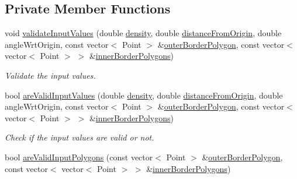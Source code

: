 \subsection*{Private Member Functions}
\begin{DoxyCompactItemize}
\item 
void \hyperlink{classmultiscale_1_1analysis_1_1Region_a6907c9f0300a4b48589164e9fea8d18e}{validate\-Input\-Values} (double \hyperlink{classmultiscale_1_1analysis_1_1SpatialEntityPseudo3D_aedf807816f8c2f7cd961acfe0042fc56}{density}, double \hyperlink{classmultiscale_1_1analysis_1_1SpatialEntityPseudo3D_a056f67b90ed41c0e6dc4df31b71ad906}{distance\-From\-Origin}, double angle\-Wrt\-Origin, const vector$<$ Point $>$ \&\hyperlink{classmultiscale_1_1analysis_1_1Region_a5cf5012f0f248cc7135f04c049365fb8}{outer\-Border\-Polygon}, const vector$<$ vector$<$ Point $>$ $>$ \&\hyperlink{classmultiscale_1_1analysis_1_1Region_adf9ce65ec31dae1083adbfed3a8f69e1}{inner\-Border\-Polygons})
\begin{DoxyCompactList}\small\item\em Validate the input values. \end{DoxyCompactList}\item 
bool \hyperlink{classmultiscale_1_1analysis_1_1Region_a69d381b185c0fc84675538bec28da0e8}{are\-Valid\-Input\-Values} (double \hyperlink{classmultiscale_1_1analysis_1_1SpatialEntityPseudo3D_aedf807816f8c2f7cd961acfe0042fc56}{density}, double \hyperlink{classmultiscale_1_1analysis_1_1SpatialEntityPseudo3D_a056f67b90ed41c0e6dc4df31b71ad906}{distance\-From\-Origin}, double angle\-Wrt\-Origin, const vector$<$ Point $>$ \&\hyperlink{classmultiscale_1_1analysis_1_1Region_a5cf5012f0f248cc7135f04c049365fb8}{outer\-Border\-Polygon}, const vector$<$ vector$<$ Point $>$ $>$ \&\hyperlink{classmultiscale_1_1analysis_1_1Region_adf9ce65ec31dae1083adbfed3a8f69e1}{inner\-Border\-Polygons})
\begin{DoxyCompactList}\small\item\em Check if the input values are valid or not. \end{DoxyCompactList}\item 
bool \hyperlink{classmultiscale_1_1analysis_1_1Region_aa7156f1a0d541ef24da8f71526540b12}{are\-Valid\-Input\-Polygons} (const vector$<$ Point $>$ \&\hyperlink{classmultiscale_1_1analysis_1_1Region_a5cf5012f0f248cc7135f04c049365fb8}{outer\-Border\-Polygon}, const vector$<$ vector$<$ Point $>$ $>$ \&\hyperlink{classmultiscale_1_1analysis_1_1Region_adf9ce65ec31dae1083adbfed3a8f69e1}{inner\-Border\-Polygons})

\end{DoxyCompactItemize}
